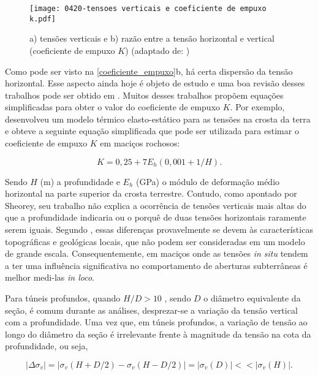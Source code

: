 \begin{figure}[H]
	\begin{center}
		\texttt{[image: 0420-tensoes verticais e coeficiente de empuxo k.pdf]}
	\end{center}
	\caption{\label{coeficiente_empuxo}a) tensões verticais e b) razão entre a tensão horizontal e vertical (coeficiente de empuxo $K$)  (adaptado de: )}
\end{figure}

Como pode ser visto na \autoref{coeficiente_empuxo}b, há certa dispersão da tensão horizontal. Esse aspecto ainda hoje é objeto de estudo e uma boa revisão desses trabalhos pode ser obtido em . Muitos desses trabalhos propõem equações simplificadas para obter o valor do coeficiente de empuxo $K$. Por exemplo,  desenvolveu um modelo térmico elasto-estático para as tensões na crosta da terra e obteve a seguinte equação simplificada que pode ser utilizada para estimar o coeficiente de empuxo $K$ em maciços rochosos:

\begin{equation}
	K = 0,25 + 7E_h(0,001+1/H).
\end{equation}

Sendo $H$ (m) a profundidade e $E_h$ (GPa) o módulo de deformação médio horizontal na parte superior da crosta terrestre. Contudo, como apontado por Sheorey, seu trabalho não explica a ocorrência de tensões verticais mais altas do que a profundidade indicaria ou o porquê de duas tensões horizontais raramente serem iguais. Segundo , essas diferenças provavelmente se devem às características topográficas e geológicas locais, que não podem ser consideradas em um modelo de grande escala. Consequentemente, em maciços onde as tensões \textit{in situ} tendem a ter uma influência significativa no comportamento de aberturas subterrâneas é melhor medi-las \textit{in loco}.

Para túneis profundos, quando $H/D > 10$ , sendo $D$ o diâmetro equivalente da seção, é comum durante as análises, desprezar-se a variação da tensão vertical com a profundidade. Uma vez que, em túneis profundos, a variação de tensão ao longo do diâmetro da seção é irrelevante frente à magnitude da tensão na cota da profundidade, ou seja,

\begin{equation}
	\left|\Delta\sigma_v\right| = \left| \sigma_v(H+D/2)-\sigma_v(H-D/2)\right| = \left| \sigma_v(D) \right| <<  \left| \sigma_v(H)\right|.
\end{equation}

